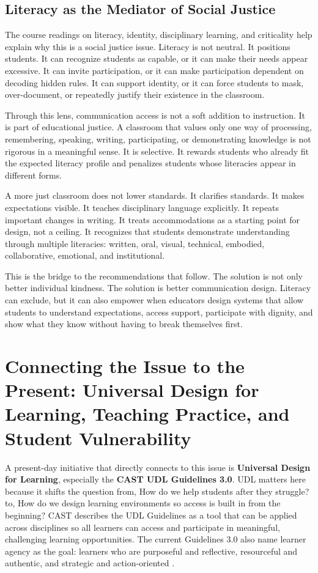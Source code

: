 \documentclass[12pt]{article}
\begin{document}
\subsection*{Literacy as the Mediator of Social Justice}

The course readings on literacy, identity, disciplinary learning, and criticality help explain why this is a social justice issue. Literacy is not neutral. It positions students. It can recognize students as capable, or it can make their needs appear excessive. It can invite participation, or it can make participation dependent on decoding hidden rules. It can support identity, or it can force students to mask, over-document, or repeatedly justify their existence in the classroom.

Through this lens, communication access is not a soft addition to instruction. It is part of educational justice. A classroom that values only one way of processing, remembering, speaking, writing, participating, or demonstrating knowledge is not rigorous in a meaningful sense. It is selective. It rewards students who already fit the expected literacy profile and penalizes students whose literacies appear in different forms.

A more just classroom does not lower standards. It clarifies standards. It makes expectations visible. It teaches disciplinary language explicitly. It repeats important changes in writing. It treats accommodations as a starting point for design, not a ceiling. It recognizes that students demonstrate understanding through multiple literacies: written, oral, visual, technical, embodied, collaborative, emotional, and institutional.

This is the bridge to the recommendations that follow. The solution is not only better individual kindness. The solution is better communication design. Literacy can exclude, but it can also empower when educators design systems that allow students to understand expectations, access support, participate with dignity, and show what they know without having to break themselves first.

\section*{Connecting the Issue to the Present: Universal Design for Learning, Teaching Practice, and Student Vulnerability}

A present-day initiative that directly connects to this issue is \textbf{Universal Design for Learning}, especially the \textbf{CAST UDL Guidelines 3.0}. UDL matters here because it shifts the question from, How do we help students after they struggle? to, How do we design learning environments so access is built in from the beginning? CAST describes the UDL Guidelines as a tool that can be applied across disciplines so all learners can access and participate in meaningful, challenging learning opportunities. The current Guidelines 3.0 also name learner agency as the goal: learners who are purposeful and reflective, resourceful and authentic, and strategic and action-oriented \citep{cast2024udl}.
\end{document}
